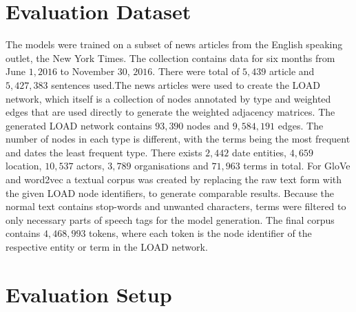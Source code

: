 \section{Evaluation Dataset}\label{sec:data}

The models were trained on a subset of news articles from the English speaking outlet, the New York Times. The collection contains data for six months from June $1, 2016$ to November $30$, $2016$. There were total of $5,439$ article and $5,427,383$ sentences used.The news articles were used to create the LOAD network, which itself is a collection of nodes annotated by type and weighted edges that are used directly to generate the weighted adjacency matrices. The generated LOAD network contains $93,390$ nodes and $9,584,191$ edges. The number of nodes in each type is different, with the terms being the most frequent and dates the least frequent type. There exists $2,442$ date entities, $4,659$ location, $10,537$ actors, $3,789$ organisations and $71,963$ terms in total. For GloVe and word2vec a textual corpus was created by replacing the raw text form with the given LOAD node identifiers, to generate comparable results. Because the normal text contains stop-words and unwanted characters, terms were filtered to only necessary parts of speech tags for the model generation. The final corpus contains $4,468,993$ tokens, where each token is the node identifier of the respective entity or term in the LOAD network. 
 
 \section{Evaluation Setup} \label{sec:setup}

